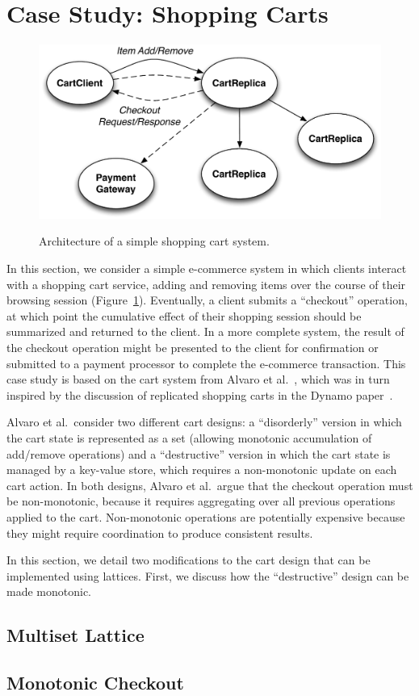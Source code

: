 \section{Case Study: Shopping Carts}
\label{sec:carts}

\begin{figure}
\includegraphics[width=\linewidth]{fig/cart_arch.pdf}
\label{fig:cart-system}
\caption{Architecture of a simple shopping cart system.}
\end{figure}

In this section, we consider a simple e-commerce system in which clients
interact with a shopping cart service, adding and removing items over the course
of their browsing session (Figure~\ref{fig:cart-system}). Eventually, a client
submits a ``checkout'' operation, at which point the cumulative effect of their
shopping session should be summarized and returned to the client. In a more
complete system, the result of the checkout operation might be presented to the
client for confirmation or submitted to a payment processor to complete the
e-commerce transaction. This case study is based on the cart system from Alvaro
et al.~\cite{Alvaro2011}, which was in turn inspired by the discussion of
replicated shopping carts in the Dynamo paper~\cite{DeCandia2007}.

Alvaro et al.\ consider two different cart designs: a ``disorderly'' version in
which the cart state is represented as a set (allowing monotonic accumulation of
add/remove operations) and a ``destructive'' version in which the cart state is
managed by a key-value store, which requires a non-monotonic update on each cart
action. In both designs, Alvaro et al.\ argue that the checkout operation must
be non-monotonic, because it requires aggregating over all previous operations
applied to the cart. Non-monotonic operations are potentially expensive because
they might require coordination to produce consistent results.

In this section, we detail two modifications to the cart design that can be
implemented using lattices. First, we discuss how the ``destructive'' design can
be made monotonic.

\subsection{Multiset Lattice}

\subsection{Monotonic Checkout}
